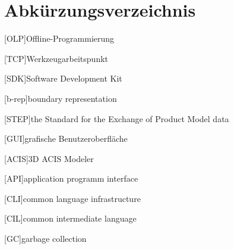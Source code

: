 \documentclass[14pt,a4paper,titlepage]{article}
\begin{document}
	\section*{Abkürzungsverzeichnis}
	\begin{acronym}[OLP]
		[OLP]{Offline-Programmierung}
	\end{acronym}
	\begin{acronym}[TCP]
		[TCP]{Werkzeugarbeitspunkt}
	\end{acronym}
	\begin{acronym}[SDK]
		[SDK]{Software Development Kit}
	\end{acronym}
	\begin{acronym}[b-rep]
		[b-rep]{boundary representation}
	\end{acronym}
	\begin{acronym}[step]
		{the Standard for the Exchange of Product Model data}
	\end{acronym}
	\begin{acronym}[gui]
		[GUI]{grafische Benutzeroberfläche}
	\end{acronym}
	\begin{acronym}[acis]
		{3D ACIS Modeler}
	\end{acronym}
	\begin{acronym}[api]
		[API]{application programm interface}
	\end{acronym}
	\begin{acronym}[cli]
		[CLI]{common language infrastructure}
	\end{acronym}
	\begin{acronym}[cil]
		[CIL]{common intermediate language}
	\end{acronym}
	\begin{acronym}[gc]
		[GC]{garbage collection}
	\end{acronym}
	\pagebreak
\end{document}
